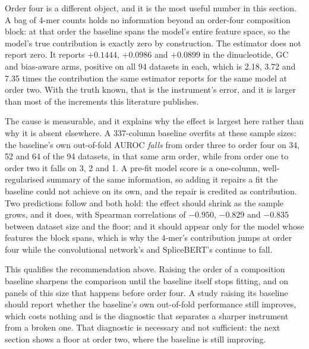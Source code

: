 Order four is a different object, and it is the most useful number in this section. A bag of
4-mer counts holds no information beyond an order-four composition block: at that order the
baseline spans the model's entire feature space, so the model's true contribution is exactly
zero by construction. The estimator does not report zero. It reports $+0.1444$, $+0.0986$ and
$+0.0899$ in the dinucleotide, GC and bias-aware arms, positive on all 94 datasets in each,
which is 2.18, 3.72 and 7.35 times the contribution the same estimator reports for the same
model at order two. With the
truth known, that is the instrument's error, and it is larger than most of the increments this
literature publishes.

The cause is measurable, and it explains why the effect is largest here rather than why it is
absent elsewhere. A 337-column baseline overfits at these
sample sizes: the baseline's own out-of-fold AUROC \emph{falls} from order three to order four
on 34, 52 and 64 of the 94 datasets, in that same arm order, while from order one to order two
it falls on 3, 2 and 1.
A pre-fit model score is a one-column, well-regularised summary of the same information, so
adding it repairs a fit the baseline could not achieve on its own, and the repair is credited as
contribution. Two predictions follow and both hold: the effect should shrink as the sample grows,
and it does, with Spearman correlations of $-0.950$, $-0.829$ and $-0.835$ between dataset size
and the floor; and it should appear only for the model whose features the block spans, which is
why the 4-mer's contribution jumps at order four while the convolutional network's and
SpliceBERT's continue to fall.

This qualifies the recommendation above. Raising the order of a composition baseline sharpens
the comparison until the baseline itself stops fitting, and on panels of this size that happens
before order four. A study raising its baseline should report whether the baseline's own
out-of-fold performance still improves, which costs nothing and is the diagnostic that separates
a sharper instrument from a broken one. That diagnostic is necessary and not sufficient: the
next section shows a floor at order two, where the baseline is still improving.

